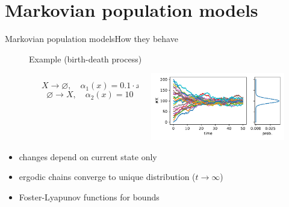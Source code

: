 \documentclass[9pt]{beamer}
\begin{document}
\section{Markovian population models}
\begin{frame}{Markovian population models}{How they behave}
    \begin{figure}
        \begin{exampleblock}{Example (birth-death process)}
        \begin{columns}
            \begin{column}{.05\paperwidth}\end{column}
            \begin{column}{.33\paperwidth}
                \vspace{-5mm}
                $$ {X\rightarrow \varnothing, \quad \alpha_1(x)=0.1 \cdot x } $$
                $$ {\varnothing\rightarrow X, \quad \alpha_2(x) = 10 } $$
                \vfill
            \end{column}
            \begin{column}{.6\paperwidth}
                \includegraphics[width=6cm]{../gfx/stationary_dist.pdf}
            \end{column}
        \end{columns}
        \end{exampleblock}
    \end{figure}
    \begin{itemize}
        \item changes depend on current state only
        \item ergodic chains converge to unique distribution ($t\to\infty$)
        \item Foster-Lyapunov functions for bounds
    \end{itemize}
\end{frame}
\end{document}

